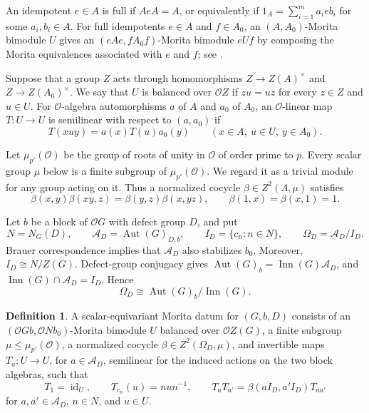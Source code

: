 \documentclass[11pt,a4paper]{article}
\theoremstyle{definition}
\newtheorem{definition}[theorem]{Definition}
\theoremstyle{remark}
\numberwithin{equation}{section}
\newcommand{\cO}{\mathcal{O}}
\DeclareMathOperator{\Aut}{Aut}
\DeclareMathOperator{\Inn}{Inn}
\DeclareMathOperator{\id}{id}
\begin{document}
	An idempotent $e\in A$ is full if $AeA=A$, or equivalently if
	$1_A=\sum_{i=1}^m a_i e b_i$ for some $a_i,b_i\in A$.
	For full idempotents $e\in A$ and $f\in A_0$, an $(A,A_0)$-Morita
	bimodule $U$ gives an $(eAe,fA_0f)$-Morita bimodule $eUf$ by composing
	the Morita equivalences associated with $e$ and $f$; see
	\cite[Theorem~2.8.7 and Corollary~2.8.10]{Linckelmann2018a}.
	
	Suppose that a group $Z$ acts through homomorphisms
	$Z\longrightarrow Z(A)^\times$ and $Z\longrightarrow Z(A_0)^\times$.
	We say that $U$ is balanced over $\cO Z$ if $zu=uz$ for every $z\in Z$ and
	$u\in U$. For $\cO$-algebra automorphisms $a$ of $A$ and $a_0$ of $A_0$, an
	$\cO$-linear map $T:U\longrightarrow U$ is semilinear with respect to
	$(a,a_0)$ if
	\[
	T(xuy)=a(x)T(u)a_0(y)\qquad(x\in A,\ u\in U,\ y\in A_0).
	\]
	
	Let $\mu_{p'}(\cO)$ be the group of roots of unity in $\cO$ of order prime
	to $p$. Every scalar group $\mu$ below is a finite subgroup of
	$\mu_{p'}(\cO)$. We regard it as a trivial module for any group acting on
	it. Thus a normalized cocycle $\beta\in Z^2(\Lambda,\mu)$ satisfies
	\[
	\beta(x,y)\beta(xy,z)=\beta(y,z)\beta(x,yz),\qquad
	\beta(1,x)=\beta(x,1)=1.
	\]
	
	Let $b$ be a block of $\cO G$ with defect group $D$, and put
	\[
	N=N_G(D),\qquad
	\mathcal A_D=\Aut(G)_{D,b},\qquad
	I_D=\{c_n:n\in N\},\qquad
	\Omega_D=\mathcal A_D/I_D.
	\]
	Brauer correspondence implies that $\mathcal A_D$ also stabilizes $b_0$.
	Moreover, $I_D\cong N/Z(G)$. Defect-group conjugacy gives
	$\Aut(G)_b=\Inn(G)\mathcal A_D$, and
	$\Inn(G)\cap\mathcal A_D=I_D$. Hence
	\begin{equation}\label{eq:outer-defect-stabilizer}
		\Omega_D\cong\Aut(G)_b/\Inn(G).
	\end{equation}
	
	\begin{definition}\label{def:datum}
		A scalar-equivariant Morita datum for $(G,b,D)$ consists of an
		$(\cO Gb,\cO Nb_0)$-Morita bimodule $U$ balanced over $\cO Z(G)$, a finite
		subgroup $\mu\leq\mu_{p'}(\cO)$, a normalized cocycle
		$\beta\in Z^2(\Omega_D,\mu)$, and invertible maps
		$T_a:U\longrightarrow U$, for $a\in\mathcal A_D$, semilinear for the
		induced actions on the two block algebras, such that
		\begin{equation}\label{eq:scalar-datum}
			T_1=\id_U,\qquad
			T_{c_n}(u)=nun^{-1},\qquad
			T_aT_{a'}=\beta(aI_D,a'I_D)T_{aa'}
		\end{equation}
		for $a,a'\in\mathcal A_D$, $n\in N$, and $u\in U$.
	\end{definition}
	
\end{document}
